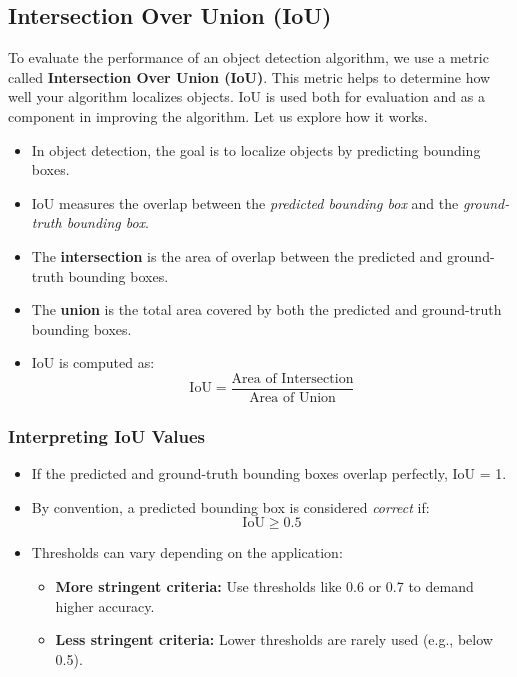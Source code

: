 \documentclass[letterpaper,12pt,notitlepage,twoside]{report}
\begin{document}
\subsection*{Intersection Over Union (IoU)}

To evaluate the performance of an object detection algorithm, we use a metric called \textbf{Intersection Over Union (IoU)}. This metric helps to determine how well your algorithm localizes objects. IoU is used both for evaluation and as a component in improving the algorithm. Let us explore how it works.

\begin{itemize}
    \item In object detection, the goal is to localize objects by predicting bounding boxes.
    \item IoU measures the overlap between the \textit{predicted bounding box} and the \textit{ground-truth bounding box}.
    \item The \textbf{intersection} is the area of overlap between the predicted and ground-truth bounding boxes.
    \item The \textbf{union} is the total area covered by both the predicted and ground-truth bounding boxes.
    \item IoU is computed as:
    \[
    \text{IoU} = \frac{\text{Area of Intersection}}{\text{Area of Union}}
    \]
\end{itemize}

\subsubsection*{Interpreting IoU Values}
\begin{itemize}
    \item If the predicted and ground-truth bounding boxes overlap perfectly, IoU = 1.
    \item By convention, a predicted bounding box is considered \textit{correct} if:
    \[
    \text{IoU} \geq 0.5
    \]
    \item Thresholds can vary depending on the application:
    \begin{itemize}
        \item \textbf{More stringent criteria:} Use thresholds like 0.6 or 0.7 to demand higher accuracy.
        \item \textbf{Less stringent criteria:} Lower thresholds are rarely used (e.g., below 0.5).
    \end{itemize}
\end{itemize}
\end{document}
